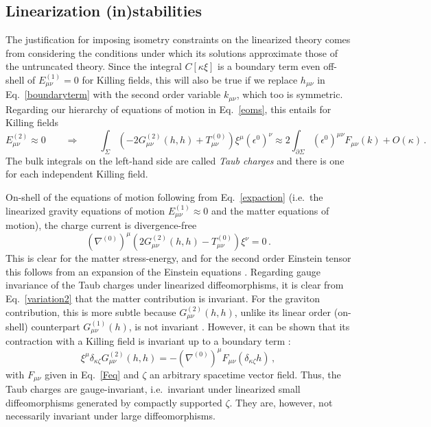 \documentclass[]{jkpaper}
\theoremstyle{plain}
\theoremstyle{definition}
\begin{document}
\subsection{Linearization (in)stabilities}




The justification for imposing isometry constraints on the linearized theory comes from considering the conditions under which its solutions approximate those of the untruncated theory.
Since the integral $C[\kappa\xi]$ is a boundary term even off-shell of $E^{(1)}_{\mu \nu}=0$ for Killing fields, this will also be true if we replace $h_{\mu \nu}$ in Eq.~\eqref{boundaryterm} with the second order variable $k_{\mu \nu}$, which too is symmetric. Regarding our hierarchy of equations of motion in Eq.~\eqref{eoms}, this entails for 
Killing fields
\begin{equation}\label{2ndorder}
E^{(2)}_{\mu \nu}\approx0\qquad\Rightarrow\qquad \int_\Sigma\left(-2G^{(2)}_{\mu \nu}(h,h)+T_{\mu \nu}^{(0)}\right)\xi^\mu(\epsilon^0)^\nu\approx 2\int_{\partial\Sigma}(\epsilon^0)^{\mu \nu}F_{\mu \nu}(k)+O(\kappa)\,.
\end{equation}
The bulk integrals on the left-hand side are called \emph{Taub charges} \cite{taub2011variational,Taub1,Taub2} and there is one for each independent Killing field. 

On-shell of the equations of motion following from Eq.~\eqref{expaction} (i.e.\ the linearized gravity equations of motion $E^{(1)}_{\mu \nu}\approx0$ and the matter equations of motion), the charge current is divergence-free
\begin{equation}\label{divfreecur}
(\nabla^{(0)})^\mu\left(2G^{(2)}_{\mu \nu}(h,h)-T_{\mu \nu}^{(0)}\right)\xi^\nu=0\,.
\end{equation}
This is clear for the matter stress-energy, and for the second order Einstein tensor this follows from an expansion of the Einstein equations \cite{Abbott:1981ff,Wald:1984rg}. Regarding gauge invariance of the Taub charges under linearized diffeomorphisms, it is clear from Eq.~\eqref{variation2} that the matter contribution is invariant. For the graviton contribution, this is more subtle because $G^{(2)}_{\mu \nu}(h,h)$, unlike its linear order (on-shell) counterpart $G^{(1)}_{\mu \nu}(h)$, is not invariant \cite{Wald:1984rg}. However, it can be shown that its contraction with a Killing field is invariant up to a boundary term \cite[App.~B]{Altas:2019qcv}:
\begin{equation}
\xi^\mu\delta_{\kappa\zeta}G^{(2)}_{\mu \nu}(h,h)=-(\nabla^{(0)})^\mu F_{\mu \nu}(\delta_{\kappa\zeta} h)\,,
\end{equation}
with $F_{\mu \nu}$ given in Eq.~\eqref{Feq} and $\zeta$ an arbitrary spacetime vector field. Thus, the Taub charges are gauge-invariant, i.e.\ invariant under linearized small diffeomorphisms generated by compactly supported $\zeta$. They are, however, not necessarily invariant under large diffeomorphisms.
\end{document}
